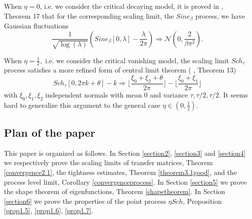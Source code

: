 \documentclass[12pt, reqno]{amsart}
\theoremstyle{definition}
\theoremstyle{remark}
\numberwithin{equation}{section}
\begin{document}
When $\eta=0$, i.e. we consider the critical decaying model, it is proved in \cite{kritchevski2011scaling}, Theorem 17 that for the corresponding scaling limit, the $Sine_\beta$ process, we have Gaussian fluctuations
$$\frac{1}{\sqrt{\log(\lambda)}}\left(Sine_\beta[0,\lambda]-\frac{\lambda}{2\pi}\right)\Rightarrow \mathcal{N}(0,\frac{2}{\beta\pi^2}).$$

When $\eta=\frac{1}{2},$ i.e. we consider the critical vanishing model, the scaling limit $Sch_\tau$ process satisfies a more refined form of central limit theorem ( \cite{kritchevski2011scaling}, Theorem 13)
\begin{equation}
    Sch_\tau[0,2\pi k+\theta]-k\Rightarrow \lfloor \frac{\xi_0+\xi_2+\theta}{2\pi}\rfloor-\lfloor \frac{\xi_0+\xi_1}{2\pi}\rfloor
\end{equation}
with $\xi_0,\xi_1,\xi_2$ independent normals with mean $0$ and variance $\tau,\tau/2,\tau/2$. It seems hard to generalize this argument to the general case $\eta\in(0,\frac{1}{2})$. 

\subsection{Plan of the paper}
This paper is organized as follows. In Section \ref{section2}, \ref{section3} and \ref{section4} we respectively prove the scaling limits of transfer matrices, Theorem \ref{convergence2.1}, the tightness estimates, Theorem \ref{theorem3.1good}, and the process level limit, Corollary \ref{convergenceprocess}. In Section \ref{section5} we prove the shape theorem of eigenfunctions, Theorem \ref{shapetheorem}. In Section \ref{section6} we prove the properties of the point process $\eta Sch$, Proposition \ref{prop1.5}, \ref{prop1.6}, \ref{prop1.7}.
\end{document}
